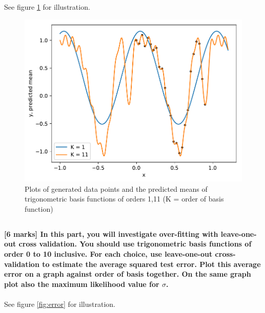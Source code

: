 \documentclass[12pt,twoside]{article}
\begin{document}
See figure \ref{fig:trig} for illustration.

\begin{figure}[h]
\centering %
\includegraphics[width = 0.9\hsize] {./figures/trigonometric.pdf}
\caption{Plots of generated data points and the predicted means of trigonometric basis functions of orders 1,11 (K = order of basis function)}%
\label{fig:trig}
\end{figure}

\newpage


\subsection{}
\textbf{[6 marks] In this part, you will investigate over-fitting with leave-one- out cross validation. You should use trigonometric basis functions of order 0 to 10 inclusive. For each choice, use leave-one-out cross-validation to estimate the average squared test error. Plot this average error on a graph against order of basis together. On the same graph plot also the maximum likelihood value for $\sigma$.}
\\ \\
See figure \ref{fig:error} for illustration.
\end{document}
